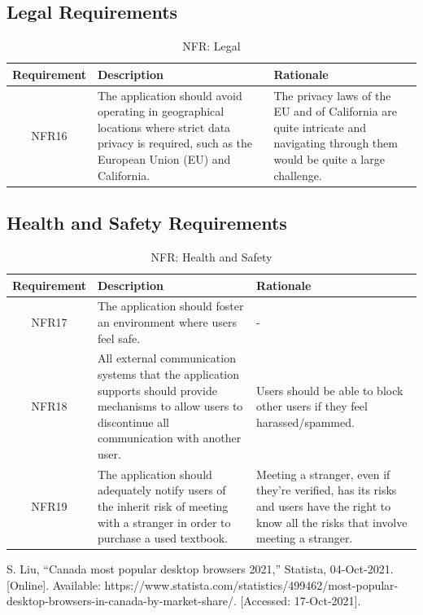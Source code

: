 \documentclass[fullpage]{article}
\begin{document}
\subsection{Legal Requirements}
\begin{table}[h!]
\flushleft
\begin{tabular}{|c|p{6cm}|p{6cm}|}
\hline
 \rowcolor{lightgray} 
\textbf{Requirement} & \textbf{Description} & \textbf{Rationale} \\
\hline
NFR16 & The application should avoid operating in geographical locations where strict data privacy is required, such as the European Union (EU) and California. %
 & The privacy laws of the EU and of California are quite intricate and navigating through them would be quite a large challenge.\\
\hline
\end{tabular}
\caption{NFR: Legal}
\end{table}

\subsection{Health and Safety Requirements}
\begin{table}[h!]
\flushleft
\begin{tabular}{|c|p{6cm}|p{6cm}|}
\hline
 \rowcolor{lightgray} 
\textbf{Requirement} & \textbf{Description} & \textbf{Rationale} \\
\hline
NFR17 & The application should foster an environment where users feel safe. & -\\
\hline
NFR18& All external communication systems that the application supports should provide mechanisms to allow users to discontinue all communication with another user. & Users should be able to block other users if they feel harassed/spammed.\\
\hline
NFR19 & The application should adequately notify users of the inherit risk of meeting with a stranger in order to purchase a used textbook. & Meeting a stranger, even if they're verified, has its risks and users have the right to know all the risks that involve meeting a stranger.\\
\hline
\end{tabular}
\caption{NFR: Health and Safety}
\end{table}

\begin{thebibliography}{9}
S. Liu, “Canada most popular desktop browsers 2021,” Statista, 04-Oct-2021. [Online]. Available: https://www.statista.com/statistics/499462/most-popular-desktop-browsers-in-canada-by-market-share/. [Accessed: 17-Oct-2021]. 
\end{thebibliography}

\end{document}
